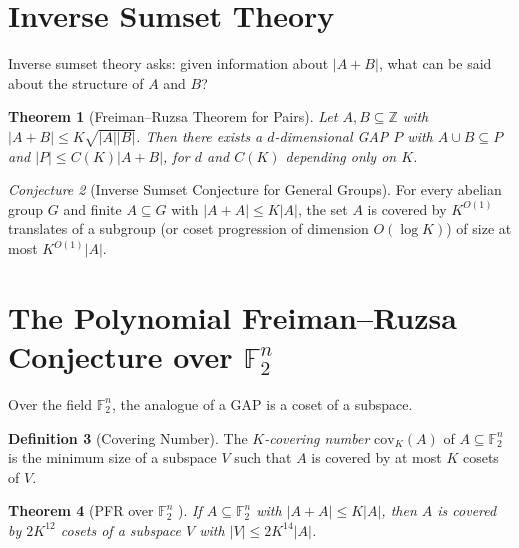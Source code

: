 \documentclass[12pt,a4paper]{amsart}
\newtheorem{theorem}{Theorem}[section]
\theoremstyle{definition}
\newtheorem{definition}[theorem]{Definition}
\theoremstyle{remark}
\newtheorem{conjecture}[theorem]{Conjecture}
\newcommand{\F}{\mathbb{F}}
\newcommand{\Z}{\mathbb{Z}}
\begin{document}
\section{Inverse Sumset Theory}\label{sec:inverse}

Inverse sumset theory asks: given information about $|A + B|$, what can be said
about the structure of $A$ and $B$?

\begin{theorem}[Freiman--Ruzsa Theorem for Pairs]\label{thm:freiman_ruzsa_pairs}
Let $A, B \subseteq \Z$ with $|A + B| \leq K \sqrt{|A||B|}$. Then there exists a
$d$-dimensional GAP $P$ with $A \cup B \subseteq P$ and $|P| \leq C(K)|A+B|$,
for $d$ and $C(K)$ depending only on $K$.
\end{theorem}

\begin{conjecture}[Inverse Sumset Conjecture for General Groups]\label{conj:inverse_general}
For every abelian group $G$ and finite $A \subseteq G$ with $|A + A| \leq K|A|$,
the set $A$ is covered by $K^{O(1)}$ translates of a subgroup (or coset progression
of dimension $O(\log K)$) of size at most $K^{O(1)} |A|$.
\end{conjecture}

\section{The Polynomial Freiman--Ruzsa Conjecture over $\F_2^n$}\label{sec:pfr_f2}

Over the field $\F_2^n$, the analogue of a GAP is a coset of a subspace.

\begin{definition}[Covering Number]
The \emph{$K$-covering number} $\mathrm{cov}_K(A)$ of $A \subseteq \F_2^n$ is the
minimum size of a subspace $V$ such that $A$ is covered by at most $K$ cosets of $V$.
\end{definition}

\begin{theorem}[PFR over $\F_2^n$ \cite{GowersTao2023}]\label{thm:pfr_f2}
If $A \subseteq \F_2^n$ with $|A + A| \leq K|A|$, then $A$ is covered by
$2K^{12}$ cosets of a subspace $V$ with $|V| \leq 2K^{14}|A|$.
\end{theorem}
\end{document}
